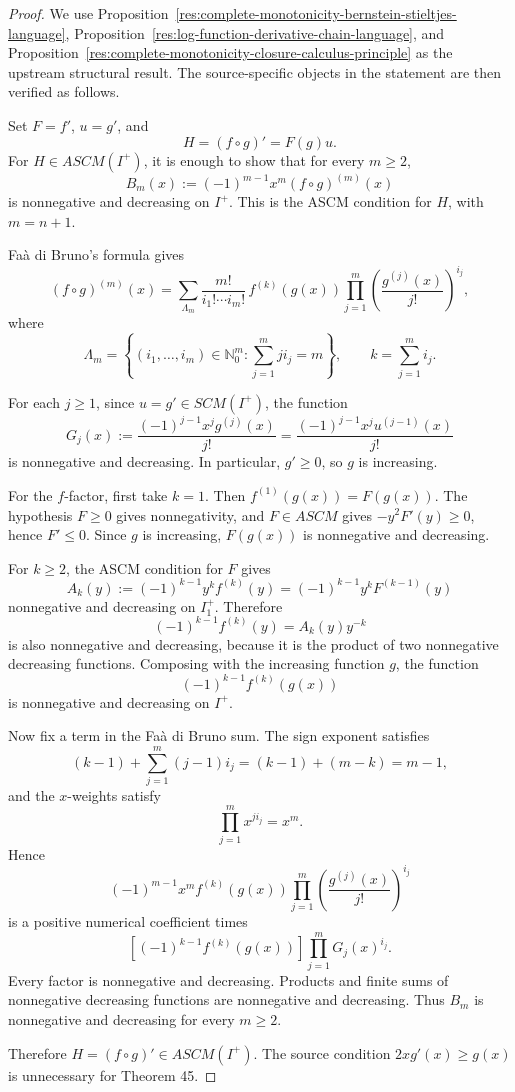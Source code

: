 \documentclass[11pt]{article}
\numberwithin{equation}{section}
\theoremstyle{definition}
\theoremstyle{remark}
\newcommand{\1}{\mathbf 1}
\begin{document}
\begin{proof}
We use Proposition~\ref{res:complete-monotonicity-bernstein-stieltjes-language}, Proposition~\ref{res:log-function-derivative-chain-language}, and Proposition~\ref{res:complete-monotonicity-closure-calculus-principle} as the upstream structural result. The source-specific objects in the statement are then verified as follows.

Set \(F=f'\), \(u=g'\), and
\[
H=(f\circ g)'=F(g)u.
\]
For \(H\in ASCM(I^+)\), it is enough to show that for every \(m\ge2\),
\[
B_m(x):=(-1)^{m-1}x^m(f\circ g)^{(m)}(x)
\]
is nonnegative and decreasing on \(I^+\). This is the ASCM condition for \(H\), with \(m=n+1\).

Faà di Bruno's formula gives
\[
(f\circ g)^{(m)}(x)
=
\sum_{\Lambda_m}
\frac{m!}{i_1!\cdots i_m!}\,
f^{(k)}(g(x))
\prod_{j=1}^m
\left(\frac{g^{(j)}(x)}{j!}\right)^{i_j},
\]
where
\[
\Lambda_m=\left\{(i_1,\ldots,i_m)\in\mathbb N_0^m:\sum_{j=1}^m j i_j=m\right\},
\qquad
k=\sum_{j=1}^m i_j.
\]

For each \(j\ge1\), since \(u=g'\in SCM(I^+)\), the function
\[
G_j(x):=\frac{(-1)^{j-1}x^j g^{(j)}(x)}{j!}
=\frac{(-1)^{j-1}x^j u^{(j-1)}(x)}{j!}
\]
is nonnegative and decreasing. In particular, \(g'\ge0\), so \(g\) is increasing.

For the \(f\)-factor, first take \(k=1\). Then \(f^{(1)}(g(x))=F(g(x))\). The hypothesis \(F\ge0\) gives nonnegativity, and \(F\in ASCM\) gives \(-y^2F'(y)\ge0\), hence \(F'\le0\). Since \(g\) is increasing, \(F(g(x))\) is nonnegative and decreasing.

For \(k\ge2\), the ASCM condition for \(F\) gives
\[
A_k(y):=(-1)^{k-1}y^k f^{(k)}(y)
=(-1)^{k-1}y^k F^{(k-1)}(y)
\]
nonnegative and decreasing on \(I_1^+\). Therefore
\[
(-1)^{k-1}f^{(k)}(y)=A_k(y)y^{-k}
\]
is also nonnegative and decreasing, because it is the product of two nonnegative decreasing functions. Composing with the increasing function \(g\), the function
\[
(-1)^{k-1}f^{(k)}(g(x))
\]
is nonnegative and decreasing on \(I^+\).

Now fix a term in the Faà di Bruno sum. The sign exponent satisfies
\[
(k-1)+\sum_{j=1}^m (j-1)i_j
=
(k-1)+(m-k)=m-1,
\]
and the \(x\)-weights satisfy
\[
\prod_{j=1}^m x^{j i_j}=x^m.
\]
Hence
\[
(-1)^{m-1}x^m
f^{(k)}(g(x))
\prod_{j=1}^m
\left(\frac{g^{(j)}(x)}{j!}\right)^{i_j}
\]
is a positive numerical coefficient times
\[
\left[(-1)^{k-1}f^{(k)}(g(x))\right]
\prod_{j=1}^m G_j(x)^{i_j}.
\]
Every factor is nonnegative and decreasing. Products and finite sums of nonnegative decreasing functions are nonnegative and decreasing. Thus \(B_m\) is nonnegative and decreasing for every \(m\ge2\).

Therefore \(H=(f\circ g)'\in ASCM(I^+)\). The source condition \(2xg'(x)\ge g(x)\) is unnecessary for Theorem 45.
\end{proof}
\end{document}
